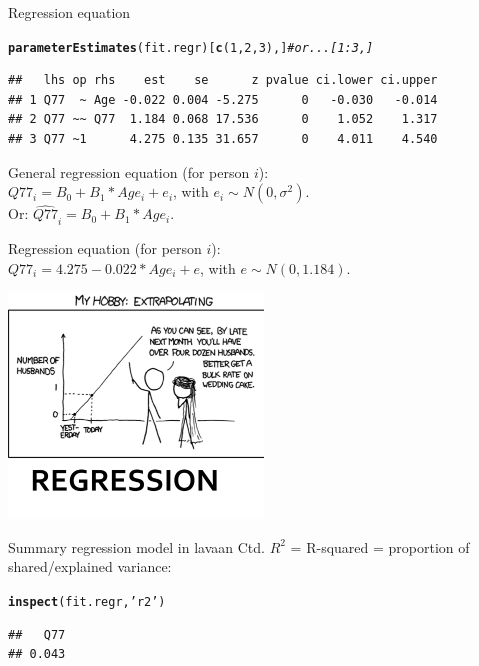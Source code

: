 \documentclass[10pt]{beamer}\usepackage[]{graphicx}\usepackage[]{xcolor}
\makeatletter
\newcommand{\hlnum}[1]{\textcolor[rgb]{0.686,0.059,0.569}{#1}}%
\newcommand{\hlstr}[1]{\textcolor[rgb]{0.192,0.494,0.8}{#1}}%
\newcommand{\hlcom}[1]{\textcolor[rgb]{0.678,0.584,0.686}{\textit{#1}}}%
\newcommand{\hlstd}[1]{\textcolor[rgb]{0.345,0.345,0.345}{#1}}%
\newcommand{\hlkwd}[1]{\textcolor[rgb]{0.737,0.353,0.396}{\textbf{#1}}}%
\newenvironment{kframe}{%
 \def\at@end@of@kframe{}%
 \ifinner\ifhmode%
  \def\at@end@of@kframe{\end{minipage}}%
  \begin{minipage}{\columnwidth}%
 \fi\fi%
 \def\FrameCommand##1{\hskip\@totalleftmargin \hskip-\fboxsep
 \colorbox{shadecolor}{##1}\hskip-\fboxsep
     \hskip-\linewidth \hskip-\@totalleftmargin \hskip\columnwidth}%
 \MakeFramed {\advance\hsize-\width
   \@totalleftmargin\z@ \linewidth\hsize
   \@setminipage}}%
 {\par\unskip\endMakeFramed%
 \at@end@of@kframe}
\newenvironment{knitrout}{}{} %
\makeatother
\begin{document}
\begin{frame}[fragile]{Regression equation}

\begin{knitrout}
\color{fgcolor}\begin{kframe}
\begin{alltt}
\hlkwd{parameterEstimates}\hlstd{(fit.regr)[}\hlkwd{c}\hlstd{(}\hlnum{1}\hlstd{,}\hlnum{2}\hlstd{,}\hlnum{3}\hlstd{),]} \hlcom{# or ...[1:3,]}
\end{alltt}
\begin{verbatim}
##   lhs op rhs    est    se      z pvalue ci.lower ci.upper
## 1 Q77  ~ Age -0.022 0.004 -5.275      0   -0.030   -0.014
## 2 Q77 ~~ Q77  1.184 0.068 17.536      0    1.052    1.317
## 3 Q77 ~1      4.275 0.135 31.657      0    4.011    4.540
\end{verbatim}
\end{kframe}
\end{knitrout}

General regression equation (for person $i$):\\
$Q77_i = B_0 + B_1*Age_i + e_i$, with $e_i \sim N(0, \sigma^2)$.\\
Or: $\hat{Q77}_i = B_0 + B_1*Age_i$.

\vspace{5mm}

Regression equation (for person $i$):\\
$Q77_i = 4.275 - 0.022*Age_i + e$, with $e \sim N(0, 1.184)$.

\end{frame}
%
\begin{frame}
\includegraphics[height=6cm,keepaspectratio=T] {regression.png}
\end{frame}
%
\begin{frame}[fragile]{Summary regression model in lavaan Ctd.}
$R^2$ = R-squared = proportion of shared/explained variance:
\begin{knitrout}
\color{fgcolor}\begin{kframe}
\begin{alltt}
\hlkwd{inspect}\hlstd{(fit.regr,} \hlstr{'r2'}\hlstd{)}
\end{alltt}
\begin{verbatim}
##   Q77 
## 0.043
\end{verbatim}
\end{kframe}
\end{knitrout}
\end{frame}
\end{document}
